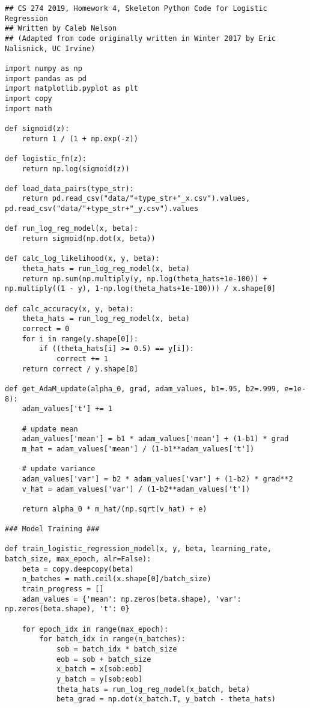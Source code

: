 \documentclass[11pt]{article}
\begin{document}
\begin{verbatim}
## CS 274 2019, Homework 4, Skeleton Python Code for Logistic Regression
## Written by Caleb Nelson
## (Adapted from code originally written in Winter 2017 by Eric Nalisnick, UC Irvine)

import numpy as np
import pandas as pd
import matplotlib.pyplot as plt
import copy
import math

def sigmoid(z):
    return 1 / (1 + np.exp(-z))

def logistic_fn(z):
    return np.log(sigmoid(z))

def load_data_pairs(type_str):
    return pd.read_csv("data/"+type_str+"_x.csv").values, pd.read_csv("data/"+type_str+"_y.csv").values

def run_log_reg_model(x, beta):
    return sigmoid(np.dot(x, beta))

def calc_log_likelihood(x, y, beta):
    theta_hats = run_log_reg_model(x, beta)
    return np.sum(np.multiply(y, np.log(theta_hats+1e-100)) + np.multiply((1 - y), 1-np.log(theta_hats+1e-100))) / x.shape[0]

def calc_accuracy(x, y, beta):
    theta_hats = run_log_reg_model(x, beta)
    correct = 0
    for i in range(y.shape[0]):
        if ((theta_hats[i] >= 0.5) == y[i]):
            correct += 1
    return correct / y.shape[0]

def get_AdaM_update(alpha_0, grad, adam_values, b1=.95, b2=.999, e=1e-8):
    adam_values['t'] += 1
    
    # update mean
    adam_values['mean'] = b1 * adam_values['mean'] + (1-b1) * grad
    m_hat = adam_values['mean'] / (1-b1**adam_values['t'])

    # update variance
    adam_values['var'] = b2 * adam_values['var'] + (1-b2) * grad**2
    v_hat = adam_values['var'] / (1-b2**adam_values['t'])

    return alpha_0 * m_hat/(np.sqrt(v_hat) + e)

### Model Training ###

def train_logistic_regression_model(x, y, beta, learning_rate, batch_size, max_epoch, alr=False):
    beta = copy.deepcopy(beta)
    n_batches = math.ceil(x.shape[0]/batch_size)
    train_progress = []
    adam_values = {'mean': np.zeros(beta.shape), 'var': np.zeros(beta.shape), 't': 0}

    for epoch_idx in range(max_epoch):
        for batch_idx in range(n_batches):
            sob = batch_idx * batch_size
            eob = sob + batch_size
            x_batch = x[sob:eob]
            y_batch = y[sob:eob]
            theta_hats = run_log_reg_model(x_batch, beta)
            beta_grad = np.dot(x_batch.T, y_batch - theta_hats)


\end{verbatim}
\end{document}
